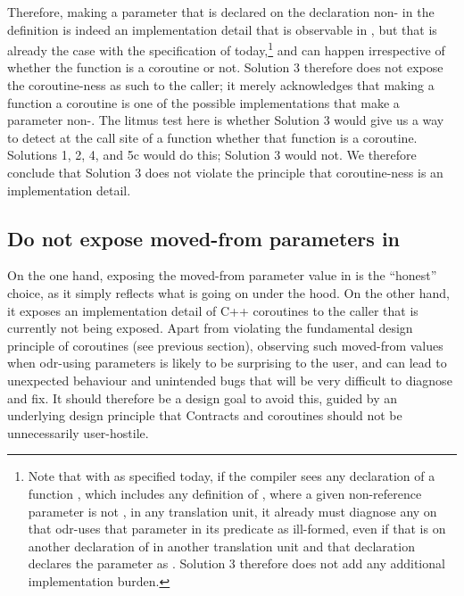 Therefore, making a parameter that is declared  on the declaration non- in the definition is indeed an implementation detail that is observable in , but that is already the case with the specification of \cite{P2900R8} today,\footnote{Note that with \cite{P2900R8} as specified today, if the compiler sees any declaration of a function , which includes any definition of , where a given non-reference parameter is not , in any translation unit, it already must diagnose any  on  that odr-uses that parameter in its predicate as ill-formed, even if that  is on another declaration of  in another translation unit and that declaration declares the parameter as . Solution 3 therefore does not add any additional implementation burden.} and can happen irrespective of whether the function is a coroutine or not. Solution 3 therefore does not expose the coroutine-ness as such to the caller; it merely acknowledges that making a function a coroutine is one of the possible implementations that make a parameter non-. The litmus test here is whether Solution 3 would give us a way to detect at the call site of a function whether that function is a coroutine. Solutions 1, 2, 4, and 5c would do this; Solution 3 would not. We therefore conclude that Solution 3 does not violate the principle that coroutine-ness is an implementation detail.

\subsection{Do not expose moved-from parameters in }

On the one hand, exposing the moved-from parameter value in  is the ``honest'' choice, as it simply reflects what is going on under the hood. On the other hand, it exposes an implementation detail of C++ coroutines to the caller that is currently not being exposed. Apart from violating the fundamental design principle of coroutines (see previous section), observing such moved-from values when odr-using  parameters is likely to be surprising to the user, and can lead to unexpected behaviour and unintended bugs that will be very difficult to diagnose and fix. It should therefore be a design goal to avoid this, guided by an underlying design principle that Contracts and coroutines should not be unnecessarily user-hostile.

